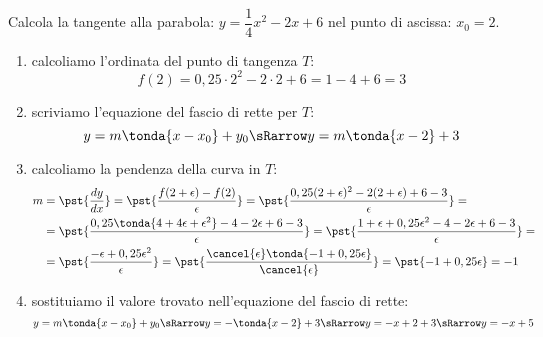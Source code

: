 \begin{esempio}
{~}

\begin{minipage}{.59\textwidth}
Calcola la tangente alla parabola:
\(y=\dfrac{1}{4}x^2-2x+6\)
nel punto di ascissa: \(x_0=2\).
\begin{enumerate}[noitemsep, wide, labelwidth=!,, labelindent=0pt]
\item calcoliamo l'ordinata del punto di tangenza \(T\):
\[f(2)=0,25 \cdot 2^2 -2 \cdot 2 +6=1-4+6=3\]
 \item scriviamo l'equazione del fascio di rette per \(T\):
\[y=m \tonda{x-x_0}+y_0 \sRarrow y=m \tonda{x-2}+3\]
\end{enumerate}
\end{minipage}
\hfill
\begin{minipage}{.39\textwidth}
\begin{center}\ipertangenteb\end{center}
\end{minipage}

\begin{enumerate}[noitemsep]
  \setcounter{enumi}{2}
 \item calcoliamo la pendenza della curva in \(T\):
\begin{align*}
m&=\pst{\dfrac{d y}{d x}}=
\pst{\dfrac{f(2+\epsilon)-f(2)}{\epsilon}}=
\pst{\dfrac{0,25(2+\epsilon)^2-2(2+\epsilon)+6-3}{\epsilon}}=\\
 &=\pst{\dfrac{0,25\tonda{4+4\epsilon+\epsilon^2}-4-2\epsilon+6-3}
              {\epsilon}}
 =\pst{\dfrac{1+\epsilon+0,25\epsilon^2-4-2\epsilon+6-3}
             {\epsilon}}=\\
&=\pst{\dfrac{-\epsilon+0,25\epsilon^2}{\epsilon}}=
\pst{\dfrac{\cancel{\epsilon}\tonda{-1+0,25\epsilon}}{\cancel{\epsilon}}}
=\pst{-1+0,25\epsilon} = - 1
\end{align*}
 \item sostituiamo il valore trovato nell'equazione del fascio di rette:
\[y = m \tonda{x-x_0}+y_0 \sRarrow y = - \tonda{x-2}+3 \sRarrow 
y = -x+2+3 \sRarrow y = -x+5\]
\end{enumerate}
\end{esempio}


